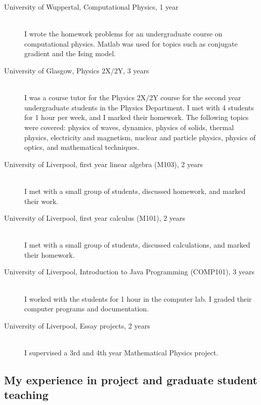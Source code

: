 \documentclass[12pt]{article}
\begin{document}
\begin{description}
  \item[University of Wuppertal, Computational Physics, 1 year] \hfill \\
I wrote
the homework problems for an 
undergraduate course on computational
physics. Matlab was used for topics such as conjugate gradient
and the Ising model.

  \item[University of Glasgow, Physics 2X/2Y, 3 years] \hfill \\
I was a course tutor for the Physics 2X/2Y course
for the second year undergraduate students
in the Physics Department. I met with 4 students for 1 hour per week,
and I marked their homework.
The following topics were covered:
physics of waves, dynamics, physics of solids, thermal physics,
electricity and magnetism, nuclear and particle physics, physics of
optics, and mathematical techniques.

\item[University of Liverpool, first year linear algebra
 (M103), 2 years] \hfill \\
I met with a small group of students, discussed homework,
and marked their work.

\item[University of Liverpool, first year calculus (M101), 2 years] \hfill \\
I met with a small group of students, discussed calculations,
and marked their homework.



\item[University of Liverpool, Introduction to Java Programming
 (COMP101), 3 years] \hfill \\
I worked with the students for 1 hour in the computer lab.
I graded their computer programs and documentation.



\item[University of Liverpool, Essay projects, 2 years] \hfill \\
I supervised a 3rd and 4th year Mathematical Physics project.

\end{description}


\subsection{My experience in project and graduate student teaching}
\end{document}
